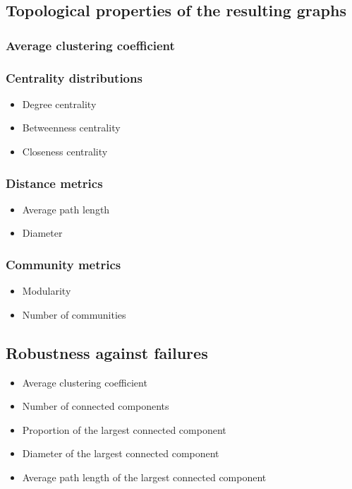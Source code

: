 \subsection{Topological properties of the resulting graphs}

\subsubsection{Average clustering coefficient}

\subsubsection{Centrality distributions}
\begin{itemize}
	\item Degree centrality
	\item Betweenness centrality
	\item Closeness centrality
\end{itemize}

\subsubsection{Distance metrics}
\begin{itemize}
	\item Average path length
	\item Diameter
\end{itemize}

\subsubsection{Community metrics}
\begin{itemize}
	\item Modularity
	\item Number of communities
\end{itemize}

\subsection{Robustness against failures}

\begin{itemize}
	\item Average clustering coefficient
	\item Number of connected components
	\item Proportion of the largest connected component
	\item Diameter of the largest connected component
	\item Average path length of the largest connected component
\end{itemize}

